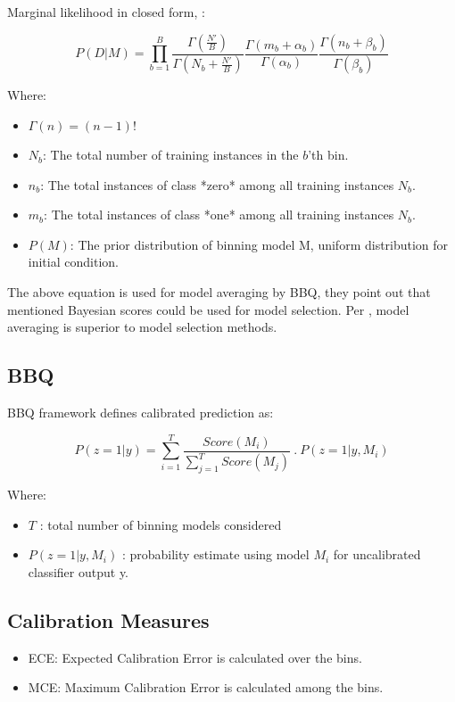 \documentclass[11pt]{article}
\begin{document}
      Marginal likelihood in closed form, \cite{heckerman1995learning}:

      $$
      P(D|M) = \prod_{b=1}^{B} \frac{\Gamma(\frac{N'}{B})}{\Gamma (N_b + \frac{N'}{B})}
      \frac{\Gamma (m_b + \alpha_b)}{\Gamma (\alpha_b)}
      \frac{\Gamma (n_b + \beta_b)}{\Gamma (\beta_b)}
      $$

      Where:
      \begin{itemize}
      \item $\Gamma(n) = (n-1)!$
      \item $N_b$: The total number of training instances in the $b$'th bin.
      \item $n_b$: The total instances of class *zero* among all training
      instances $N_b$.
      \item $m_b$: The total instances of class *one* among all training
      instances $N_b$.
      \item $P(M)$: The prior distribution of binning model M, uniform
      distribution for initial condition.
      \end{itemize}

      \par The above equation is used for model averaging by BBQ, they point
      out that mentioned Bayesian scores could be used for model selection. Per
      \cite{hoeting1999bayesian}, model averaging is superior to model
      selection methods.

      \subsection{BBQ}
      BBQ framework defines calibrated prediction as:

      $$
      P(z=1|y) = \sum_{i=1}^{T} \frac{\textit{Score}(M_i)}{\sum_{j=1}^{T} \textit{Score}(M_j)}
      ~.~ P(z=1 | y, M_i)
      $$

      Where:
      \begin{itemize}
            \item $T$ : total number of binning models considered
            \item $P(z=1 | y, M_i)$ : probability estimate using model $M_i$ for uncalibrated
      classifier output y.
      \end{itemize}


      \subsection{Calibration Measures}
      \begin{itemize}
            \item ECE: Expected Calibration Error is calculated over the bins.
            \item MCE: Maximum Calibration Error is calculated among the bins.
      \end{itemize}
\end{document}
